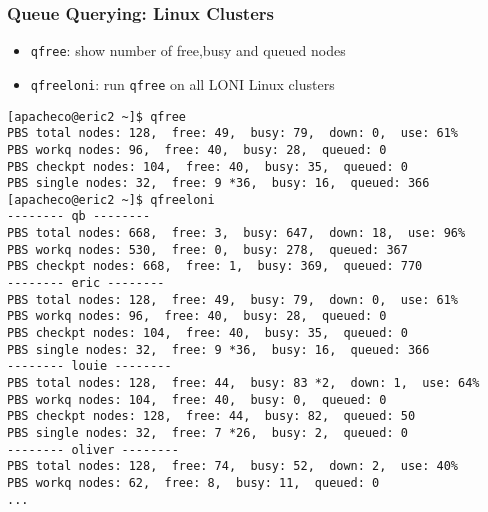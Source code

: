 \documentclass[slidestop,mathserif,compress,xcolor=svgnames,table]{beamer}
\newenvironment{eblock}[0]
{
\begin{beamerboxesrounded}[upper=uppercol2,lower=lowercol2,shadow=true]}
{\end{beamerboxesrounded}}
\begin{document}
\begin{frame}[fragile]
  \frametitle{\small Queue Querying: Linux Clusters}
  \begin{itemize}
    \item \texttt{qfree}: show number of free,busy and queued nodes
    \item \texttt{qfreeloni}: run \texttt{qfree} on all LONI Linux clusters
  \end{itemize}
  \begin{eblock}{}
    {\tiny
    \begin{verbatim}
[apacheco@eric2 ~]$ qfree
PBS total nodes: 128,  free: 49,  busy: 79,  down: 0,  use: 61%
PBS workq nodes: 96,  free: 40,  busy: 28,  queued: 0
PBS checkpt nodes: 104,  free: 40,  busy: 35,  queued: 0
PBS single nodes: 32,  free: 9 *36,  busy: 16,  queued: 366
[apacheco@eric2 ~]$ qfreeloni
-------- qb --------
PBS total nodes: 668,  free: 3,  busy: 647,  down: 18,  use: 96%
PBS workq nodes: 530,  free: 0,  busy: 278,  queued: 367
PBS checkpt nodes: 668,  free: 1,  busy: 369,  queued: 770
-------- eric --------
PBS total nodes: 128,  free: 49,  busy: 79,  down: 0,  use: 61%
PBS workq nodes: 96,  free: 40,  busy: 28,  queued: 0
PBS checkpt nodes: 104,  free: 40,  busy: 35,  queued: 0
PBS single nodes: 32,  free: 9 *36,  busy: 16,  queued: 366
-------- louie --------
PBS total nodes: 128,  free: 44,  busy: 83 *2,  down: 1,  use: 64%
PBS workq nodes: 104,  free: 40,  busy: 0,  queued: 0
PBS checkpt nodes: 128,  free: 44,  busy: 82,  queued: 50
PBS single nodes: 32,  free: 7 *26,  busy: 2,  queued: 0
-------- oliver --------
PBS total nodes: 128,  free: 74,  busy: 52,  down: 2,  use: 40%
PBS workq nodes: 62,  free: 8,  busy: 11,  queued: 0
...
    \end{verbatim}
    }
  \end{eblock}
\end{frame}
\end{document}
